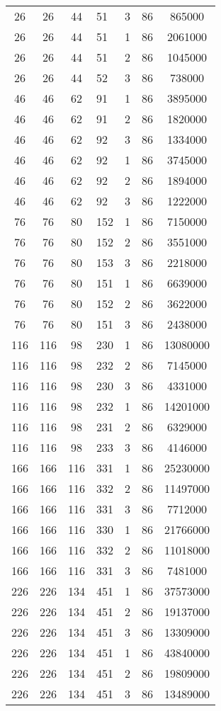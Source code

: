 \documentclass[a4paper,11pt]{article}
\begin{document}
\begin{longtable}{ |c|c|c|p{3cm}|c|c|c| }
26 & 26 & 44 & 51 & 3 & 86 & 865000 \\
26 & 26 & 44 & 51 & 1 & 86 & 2061000 \\
26 & 26 & 44 & 51 & 2 & 86 & 1045000 \\
26 & 26 & 44 & 52 & 3 & 86 & 738000 \\
46 & 46 & 62 & 91 & 1 & 86 & 3895000 \\
46 & 46 & 62 & 91 & 2 & 86 & 1820000 \\
46 & 46 & 62 & 92 & 3 & 86 & 1334000 \\
46 & 46 & 62 & 92 & 1 & 86 & 3745000 \\
46 & 46 & 62 & 92 & 2 & 86 & 1894000 \\
46 & 46 & 62 & 92 & 3 & 86 & 1222000 \\
76 & 76 & 80 & 152 & 1 & 86 & 7150000 \\
76 & 76 & 80 & 152 & 2 & 86 & 3551000 \\
76 & 76 & 80 & 153 & 3 & 86 & 2218000 \\
76 & 76 & 80 & 151 & 1 & 86 & 6639000 \\
76 & 76 & 80 & 152 & 2 & 86 & 3622000 \\
76 & 76 & 80 & 151 & 3 & 86 & 2438000 \\
116 & 116 & 98 & 230 & 1 & 86 & 13080000 \\
116 & 116 & 98 & 232 & 2 & 86 & 7145000 \\
116 & 116 & 98 & 230 & 3 & 86 & 4331000 \\
116 & 116 & 98 & 232 & 1 & 86 & 14201000 \\
116 & 116 & 98 & 231 & 2 & 86 & 6329000 \\
116 & 116 & 98 & 233 & 3 & 86 & 4146000 \\
166 & 166 & 116 & 331 & 1 & 86 & 25230000 \\
166 & 166 & 116 & 332 & 2 & 86 & 11497000 \\
166 & 166 & 116 & 331 & 3 & 86 & 7712000 \\
166 & 166 & 116 & 330 & 1 & 86 & 21766000 \\
166 & 166 & 116 & 332 & 2 & 86 & 11018000 \\
166 & 166 & 116 & 331 & 3 & 86 & 7481000 \\
226 & 226 & 134 & 451 & 1 & 86 & 37573000 \\
226 & 226 & 134 & 451 & 2 & 86 & 19137000 \\
226 & 226 & 134 & 451 & 3 & 86 & 13309000 \\
226 & 226 & 134 & 451 & 1 & 86 & 43840000 \\
226 & 226 & 134 & 451 & 2 & 86 & 19809000 \\
226 & 226 & 134 & 451 & 3 & 86 & 13489000 \\

       \hline
    \end{longtable}
\end{document}
